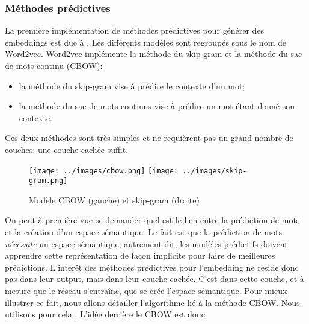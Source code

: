 \documentclass[french]{article}
\begin{document}
			\subsubsection{Méthodes prédictives}
				La première implémentation de méthodes prédictives pour générer des embeddings est due à \cite{mikolov2013}. Les différents modèles sont regroupés sous le nom de Word2vec. Word2vec implémente la méthode du skip-gram et la méthode du sac de mots continu (CBOW):
				\begin{itemize}
					\item la méthode du skip-gram vise à prédire le contexte d'un mot;
					\item la méthode du sac de mots continus vise à prédire un mot étant donné son contexte.
				\end{itemize}
				Ces deux méthodes sont très simples et ne requièrent pas un grand nombre de couches: une couche cachée suffit.	
				\begin{figure}[H]
					\texttt{[image: ../images/cbow.png]}
					\texttt{[image: ../images/skip-gram.png]}
					\caption{Modèle CBOW (gauche) et skip-gram (droite)}
				\end{figure}
				On peut à première vue se demander quel est le lien entre la prédiction de mots et la création d'un espace sémantique. Le fait est que la prédiction de mots \textit{nécessite} un espace sémantique; autrement dit, les modèles prédictifs doivent apprendre cette représentation de façon implicite pour faire de meilleures prédictions. L'intérêt des méthodes prédictives pour l'embedding ne réside donc pas dans leur output, mais dans leur couche cachée. C'est dans cette couche, et à mesure que le réseau s'entraîne, que se crée l'espace sémantique. Pour mieux illustrer ce fait, nous allons détailler l'algorithme lié à la méthode CBOW. Nous utilisons pour cela \cite{socher2016}. L'idée  derrière le CBOW est donc:
\end{document}
